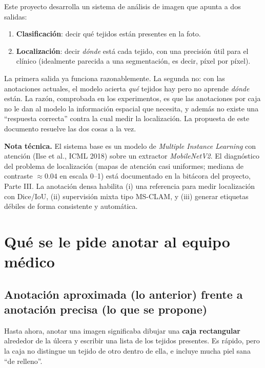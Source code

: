 \documentclass[12pt,letterpaper]{article}
\newcommand{\notatecnica}[1]{%
    \par\vspace{4pt}
    \noindent\colorbox{tecnico!8}{%
        \parbox{\dimexpr\linewidth-2\fboxsep}{%
            \small\textcolor{tecnico}{\textbf{Nota técnica.}} \small #1}}%
    \par\vspace{4pt}
}
\begin{document}
Este proyecto desarrolla un sistema de análisis de imagen que apunta a dos salidas:

\begin{enumerate}
  \item \textbf{Clasificación}: decir qué tejidos están presentes en la foto.
  \item \textbf{Localización}: decir \emph{dónde} está cada tejido, con una precisión útil para el
        clínico (idealmente parecida a una segmentación, es decir, píxel por píxel).
\end{enumerate}

La primera salida ya funciona razonablemente. La segunda no: con las anotaciones actuales, el modelo
acierta \emph{qué} tejidos hay pero no aprende \emph{dónde} están. La razón, comprobada en los
experimentos, es que las anotaciones por caja no le dan al modelo la información espacial que
necesita, y además no existe una ``respuesta correcta'' contra la cual medir la localización. La
propuesta de este documento resuelve las dos cosas a la vez.

\notatecnica{El sistema base es un modelo de \textit{Multiple Instance Learning} con atención (Ilse
et al., ICML 2018) sobre un extractor \textit{MobileNetV2}. El diagnóstico del problema de
localización (mapas de atención casi uniformes; mediana de contraste $\approx 0.04$ en escala 0--1)
está documentado en la bitácora del proyecto, Parte III. La anotación densa habilita (i) una
referencia para medir localización con Dice/IoU, (ii) supervisión mixta tipo MS-CLAM, y (iii)
generar etiquetas débiles de forma consistente y automática.}

\section{Qué se le pide anotar al equipo médico}

\subsection{Anotación aproximada (lo anterior) frente a anotación precisa (lo que se propone)}

Hasta ahora, anotar una imagen significaba dibujar una \textbf{caja rectangular} alrededor de la
úlcera y escribir una lista de los tejidos presentes. Es rápido, pero la caja no distingue un tejido
de otro dentro de ella, e incluye mucha piel sana ``de relleno''.
\end{document}

